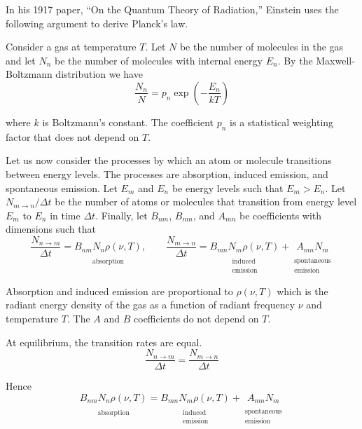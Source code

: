 \documentclass[12pt]{article}
\newcommand\BNM{B_{nm}} %
\newcommand\BMN{B_{mn}} %
\newcommand\AMN{A_{mn}} %
\newcommand\RHO{\rho(\nu,T)}
\newcommand\ABSORPTION{\substack{\\[1ex] \text{absorption}}}
\newcommand\INDUCED{\substack{\\[1ex] \text{induced}\\ \text{emission}}}
\newcommand\SPONTANEOUS{\substack{\\[1ex] \text{spontaneous}\\ \text{emission}}}
\begin{document}
\noindent
In his 1917 paper, ``On the Quantum Theory of Radiation,''
Einstein uses the following argument to derive Planck's law.

\bigskip
\noindent
Consider a gas at temperature $T$.
Let $N$ be the number of molecules in the gas
and let $N_n$ be the number of molecules with internal energy $E_n$.
By the Maxwell-Boltzmann distribution we have
\begin{equation*}
\frac{N_n}{N}=p_n\exp\left(-\frac{E_n}{kT}\right)
\tag{1}
\end{equation*}

\noindent
where $k$ is Boltzmann's constant.
The coefficient $p_n$ is a statistical weighting factor that does not depend on $T$.

\bigskip
\noindent
Let us now consider the processes by which an atom or molecule transitions between energy levels.
The processes are absorption, induced emission, and spontaneous emission.
Let $E_m$ and $E_n$ be energy levels such that $E_m>E_n$.
Let $N_{m\rightarrow n}/\Delta t$ be the number of atoms or molecules that transition from energy level $E_m$ to $E_n$ in time $\Delta t$.
Finally, let $\BNM$, $\BMN$, and $\AMN$ be coefficients with dimensions such that
\begin{equation*}
\frac{N_{n\rightarrow m}}{\Delta t}
=\underset{\ABSORPTION}{\BNM N_n \RHO},
\qquad
\frac{N_{m\rightarrow n}}{\Delta t}
=\underset{\INDUCED}{\BMN N_m \RHO}
+
\underset{\SPONTANEOUS}{\AMN N_m}
\end{equation*}

\noindent
Absorption and induced emission are proportional to $\RHO$
which is the radiant energy density of the gas
as a function of radiant frequency $\nu$ and temperature $T$.
The $A$ and $B$ coefficients do not depend on $T$.

\bigskip
\noindent
At equilibrium, the transition rates are equal.
\begin{equation*}
\frac{N_{n\rightarrow m}}{\Delta t}=\frac{N_{m\rightarrow n}}{\Delta t}
\end{equation*}

\noindent
Hence
\begin{equation*}
\underset{\ABSORPTION}{\BNM N_n \RHO}
=\underset{\INDUCED}{\BMN N_m \RHO}
+\underset{\SPONTANEOUS}{\AMN N_m}
\end{equation*}
\end{document}
